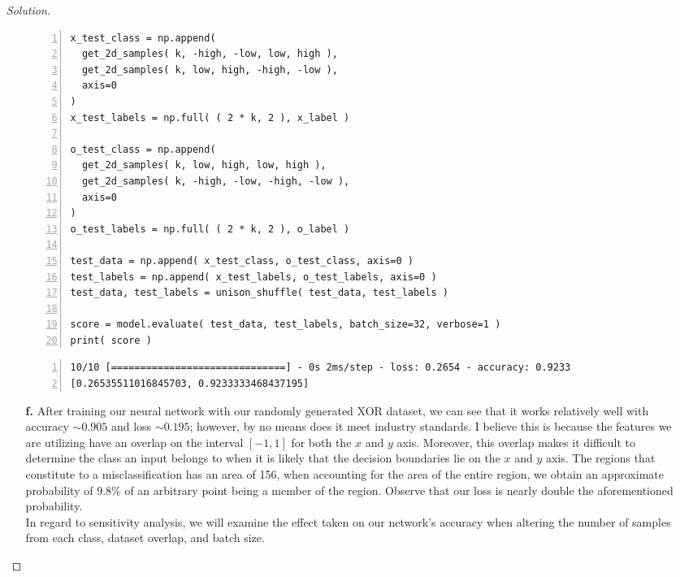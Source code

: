 \documentclass[ 12pt ]{article}
\begin{document}
\begin{enumerate}
\begin{proof}[Solution]
\begin{enumerate}
\begin{lstlisting}[basicstyle=\ttfamily\footnotesize, numbers=left, tabsize=4, frame=single, breaklines=true, postbreak=\mbox{\textcolor{red}{$\hookrightarrow$}\space}]
x_test_class = np.append(
  get_2d_samples( k, -high, -low, low, high ),
  get_2d_samples( k, low, high, -high, -low ),
  axis=0
)
x_test_labels = np.full( ( 2 * k, 2 ), x_label )

o_test_class = np.append(
  get_2d_samples( k, low, high, low, high ),
  get_2d_samples( k, -high, -low, -high, -low ),
  axis=0
)
o_test_labels = np.full( ( 2 * k, 2 ), o_label )

test_data = np.append( x_test_class, o_test_class, axis=0 )
test_labels = np.append( x_test_labels, o_test_labels, axis=0 )
test_data, test_labels = unison_shuffle( test_data, test_labels )

score = model.evaluate( test_data, test_labels, batch_size=32, verbose=1 )
print( score )
					\end{lstlisting}
					\begin{lstlisting}[basicstyle=\ttfamily\footnotesize, numbers=left, tabsize=4, frame=single, breaklines=true, postbreak=\mbox{\textcolor{red}{$\hookrightarrow$}\space}]
10/10 [==============================] - 0s 2ms/step - loss: 0.2654 - accuracy: 0.9233
[0.26535511016845703, 0.9233333468437195]
					\end{lstlisting}

				\item[\textbf{f.}] After training our neural network with our randomly generated XOR dataset, we can see that it works relatively well with accuracy $\sim 0.905$ and
					loss $\sim 0.195$; however, by no means does it meet industry standards. I believe this is because the features we are utilizing have an overlap on the interval
					$[-1, 1]$ for both the $x$ and $y$ axis. Moreover, this overlap makes it difficult to determine the class an input belongs to when it is likely that the decision
					boundaries lie on the $x$ and $y$ axis. The regions that constitute to a misclassification has an area of 156, when accounting for the area of the entire region,
					we obtain an approximate probability of 9.8\% of an arbitrary point being a member of the region. Observe that our loss is nearly double the aforementioned
					probability. \\
					In regard to sensitivity analysis, we will examine the effect taken on our network's accuracy when altering the number of samples from each class, dataset overlap,
					and batch size.
					\begin{center}
					

\end{center}
\end{enumerate}
\end{proof}
\end{enumerate}
\end{document}

